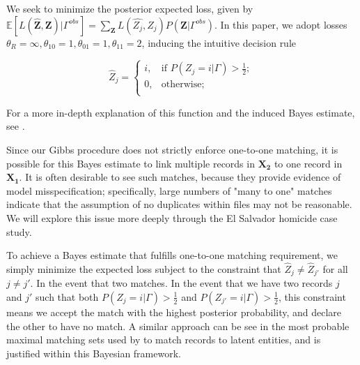 \documentclass[12pt,letterpaper]{article}
\newcommand{\1}[1]{\mathbb{I}\!\left[#1\right]} %
\begin{document}
We seek to minimize the posterior expected loss, given by $\mathbb{E}[L(\hat{\mathbf{Z}}, \mathbf{Z})|\Gamma^{obs}] = \sum_{\mathbf{Z}} L(\hat{Z_j}, Z_j)P(\mathbf{Z}|\Gamma^{obs})$. In this paper, we adopt losses
\(\theta_R = \infty, \theta_{10} = 1, \theta_{01} = 1, \theta_{11} = 2\), inducing the intuitive decision rule

\[\hat{Z}_j =\begin{cases} 
	i,  & \text{if } P(Z_j = i |\Gamma) > \frac{1}{2}; \\
	0,  & \text{otherwise} ; \\
\end{cases}\]

For a more in-depth explanation of this function and the induced Bayes
estimate, see \citep{sadinle_bayesian_2017}.

Since our Gibbs procedure does not strictly enforce one-to-one matching, it is possible for this Bayes estimate to link multiple records in $\bm{X_2}$ to one record in $\bm{X_1}$. It is often desirable to see such matches, because they provide evidence of model misspecification; specifically, large numbers of "many to one" matches indicate that the assumption of no duplicates within files may not be reasonable. We will explore this issue more deeply through the El Salvador homicide case study. 

To achieve a Bayes estimate that fulfills one-to-one matching requirement, we simply minimize the expected loss subject to the constraint that $\hat{Z}_j \neq \hat{Z}_{j'}$ for all $j \neq j'$. In the event that two matches. In the event that we have two records $j$ and $j'$ such that both $P(Z_j = i |\Gamma) > \frac{1}{2}$ and $ P(Z_{j'} = i |\Gamma) > \frac{1}{2}$, this constraint means we accept the match with the highest posterior probability, and declare the other to have no match.  A similar approach can be see in the most probable maximal matching sets used by \citep{steorts_2013} to match records to latent entities, and is justified within this Bayesian framework.
\end{document}
